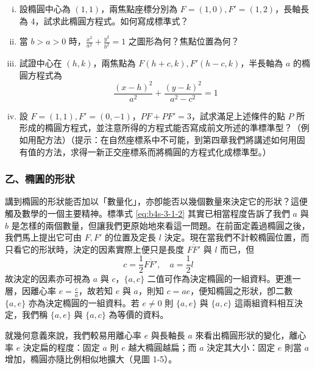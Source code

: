 \begin{exercise}
\begin{enumerate}[(i)]
  \item 設橢圓中心為 $(1,1)$，兩焦點座標分別為 $F=(1,0), F'=(1,2)$，長軸長為 4，試求此橢圓方程式。如何寫成標準式？
  \item 當 $b > a > 0$ 時，$\frac{x^2}{a^2} + \frac{y^2}{b^2} = 1$ 之圖形為何？焦點位置為何？
  \item 試證中心在 $(h,k)$，兩焦點為 $F(h+c, k), F'(h-c, k)$，半長軸為 $a$ 的橢圓方程式為
  \[ \frac{(x-h)^2}{a^2} + \frac{(y-k)^2}{a^2 - c^2} = 1 \]
  \item 設 $F=(1,1), F'=(0,-1)$，$PF + PF' = 3$，試求滿足上述條件的點 $P$ 所形成的橢圓方程式，並注意所得的方程式能否寫成前文所述的準標準型？（例如用配方法）（提示：在自然座標系中不可能，到第四章我們將講述如何用固有值的方法，求得一新正交座標系而將橢圓的方程式化成標準型。）
\end{enumerate}
\end{exercise}

\subsubsection*{乙、橢圓的形狀}

講到橢圓的形狀能否加以「數量化」，亦卽能否以幾個數量來決定它的形狀？這便觸及數學的一個主要精神。標準式 \eqref{eq:b4s-3-1-2} 其實已相當程度告訴了我們 $a$ 與 $b$ 是怎樣的兩個數量，但讓我們更原始地來看這一問題。在前面定義過橢圓之後，我們馬上提出它可由 $F, F'$ 的位置及定長 $l$ 決定。現在當我們不計較橢圓位置，而只看它的形狀時，決定的因素實際上便只是長度 $\overline{FF'}$ 與 $l$ 而已，但
\[ c = \frac{1}{2}\overline{FF'}, \quad a = \frac{1}{2}l \]
故決定的因素亦可視為 $a$ 與 $c$，$\{a, c\}$ 二值可作為決定橢圓的一組資料。更進一層，因離心率 $e = \frac{c}{a}$，故若知 $e$ 與 $a$，則知 $c = ae$，便知橢圓之形狀，卽二數 $\{a, e\}$ 亦為決定橢圓的一組資料。若 $e \neq 0$ 則 $\{a, e\}$ 與 $\{a, c\}$ 這兩組資料相互決定，我們稱 $\{a, e\}$ 與 $\{a, c\}$ 為等價的資料。

就幾何意義來說，我們較易用離心率 $e$ 與長軸長 $a$ 來看出橢圓形狀的變化，離心率 $e$ 決定扁的程度：固定 $a$ 則 $e$ 越大橢圓越扁；而 $a$ 決定其大小：固定 $e$ 則當 $a$ 增加，橢圓亦隨比例相似地擴大（見圖 1-5）。

